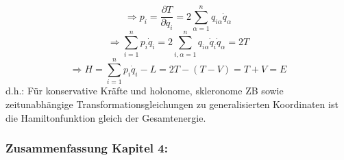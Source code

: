 \documentclass[10pt, letterpaper]{article}
\begin{document}
$$\Rightarrow p_i = \frac{\partial T}{\partial \dot{q}_i} = 2\sum_{\alpha=1}^n q_{i\alpha}\dot{q}_\alpha$$
$$\Rightarrow \sum_{i=1}^n p_i\dot{q}_i = 2\sum_{i,\alpha=1}^n q_{i\alpha}\dot{q}_i\dot{q}_\alpha = 2T$$
$$\Rightarrow H = \sum_{i=1}^n p_i\dot{q}_i - L = 2T-(T-V) = T+V = E$$
d.h.: Für konservative Kräfte und holonome, skleronome ZB sowie zeitunabhängige Transformationsgleichungen zu generalisierten Koordinaten ist die Hamiltonfunktion gleich der Gesamtenergie.




\subsubsection{Zusammenfassung Kapitel 4:}



\end{document}

